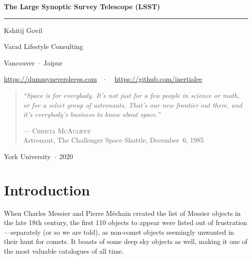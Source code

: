 \documentclass[12pt,a4paper]{article}
\begin{document}
\begin{titlepage}
  \centering
  \vspace*{30mm}
  {\LARGE\bfseries The Large Synoptic Survey Telescope (LSST)\par}
  \vspace{8mm}
  \rule{\textwidth}{0.5pt}
  \vspace{8mm}
  {\large Kshitij Govil\par}
  \vspace{4mm}
  {\normalsize Varad Lifestyle Consulting\par}
  {\normalsize Vancouver~$\cdot$~Jaipur\par}
  \vspace{8mm}
  {\small\url{https://dummyneversleeps.com}~~$\cdot$~~
         \url{https://github.com/inertialee}\par}
  \vspace{16mm}
  \begin{quote}
    \itshape
    ``Space is for everybody. It's not just for a few people in science or math,
    or for a select group of astronauts. That's our new frontier out there,
    and it's everybody's business to know about space.''
    \begin{flushright}
      --- \textsc{Christa McAuliffe}\\
      {\small Astronaut, The Challenger Space Shuttle, December~6, 1985}
    \end{flushright}
  \end{quote}
  \vfill
  {\small York University~$\cdot$~2020}
\end{titlepage}

\tableofcontents
\newpage

\section{Introduction}

When Charles Messier and Pierre M\'{e}chain created the list of Messier objects
in the late 18th century, the first 110 objects to appear were listed out of
frustration---separately (or so we are told), as non-comet objects seemingly
unwanted in their hunt for comets. It boasts of some deep sky objects as well,
making it one of the most valuable catalogues of all time.
\end{document}

